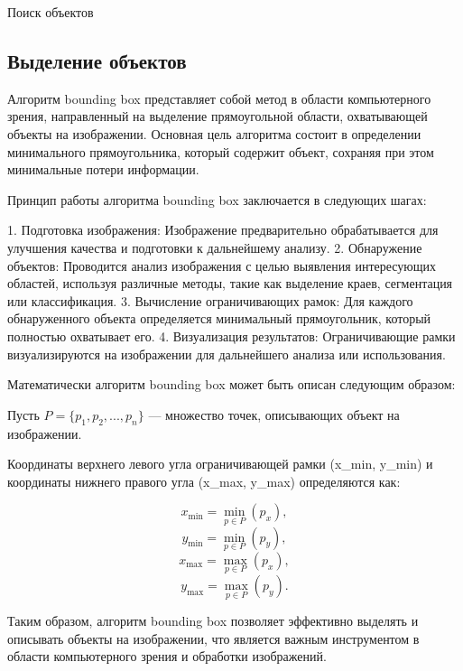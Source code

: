 Поиск объектов 



\subsection{Выделение объектов}


Алгоритм bounding box представляет собой метод в области компьютерного зрения, направленный на выделение прямоугольной области, охватывающей объекты на изображении. Основная цель алгоритма состоит в определении минимального прямоугольника, который содержит объект, сохраняя при этом минимальные потери информации.

Принцип работы алгоритма bounding box заключается в следующих шагах:

1. Подготовка изображения: Изображение предварительно обрабатывается для улучшения качества и подготовки к дальнейшему анализу.
2. Обнаружение объектов: Проводится анализ изображения с целью выявления интересующих областей, используя различные методы, такие как выделение краев, сегментация или классификация.
3. Вычисление ограничивающих рамок: Для каждого обнаруженного объекта определяется минимальный прямоугольник, который полностью охватывает его.
4. Визуализация результатов: Ограничивающие рамки визуализируются на изображении для дальнейшего анализа или использования.

Математически алгоритм bounding box может быть описан следующим образом:

Пусть \( P = \{p_1, p_2, ..., p_n\} \) — множество точек, описывающих объект на изображении.

Координаты верхнего левого угла ограничивающей рамки (x_min, y_min) и координаты нижнего правого угла (x_max, y_max) определяются как:

\[ x_{\text{min}} = \min_{p \in P} (p_x), \]
\[ y_{\text{min}} = \min_{p \in P} (p_y), \]
\[ x_{\text{max}} = \max_{p \in P} (p_x), \]
\[ y_{\text{max}} = \max_{p \in P} (p_y). \]

Таким образом, алгоритм bounding box позволяет эффективно выделять и описывать объекты на изображении, что является важным инструментом в области компьютерного зрения и обработки изображений.
